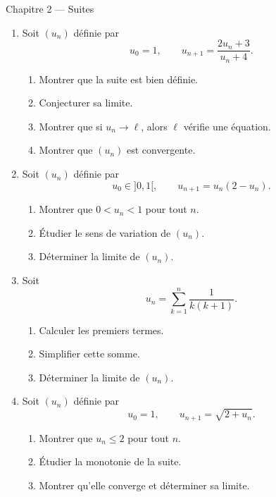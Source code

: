\documentclass[11pt,a4paper]{article}
\begin{document}
\begin{chapitrebox}{Chapitre 2 --- Suites}
\end{chapitrebox}

\begin{enumerate}[label=\textbf{Exercice \arabic*.}, start=1, leftmargin=*, itemsep=1em]

\item Soit \((u_n)\) définie par
\[
u_0=1,\qquad u_{n+1}=\frac{2u_n+3}{u_n+4}.
\]

\begin{enumerate}[label=\alph*)]
    \item Montrer que la suite est bien définie.
    \item Conjecturer sa limite.
    \item Montrer que si \(u_n\to \ell\), alors \(\ell\) vérifie une équation.
    \item Montrer que \((u_n)\) est convergente.
\end{enumerate}

\item Soit \((u_n)\) définie par
\[
u_0\in ]0,1[,\qquad u_{n+1}=u_n(2-u_n).
\]

\begin{enumerate}[label=\alph*)]
    \item Montrer que \(0<u_n<1\) pour tout \(n\).
    \item Étudier le sens de variation de \((u_n)\).
    \item Déterminer la limite de \((u_n)\).
\end{enumerate}

\item Soit
\[
u_n=\sum_{k=1}^n \frac{1}{k(k+1)}.
\]

\begin{enumerate}[label=\alph*)]
    \item Calculer les premiers termes.
    \item Simplifier cette somme.
    \item Déterminer la limite de \((u_n)\).
\end{enumerate}

\item Soit \((u_n)\) définie par
\[
u_0=1,\qquad u_{n+1}=\sqrt{2+u_n}.
\]

\begin{enumerate}[label=\alph*)]
    \item Montrer que \(u_n\leq 2\) pour tout \(n\).
    \item Étudier la monotonie de la suite.
    \item Montrer qu'elle converge et déterminer sa limite.
\end{enumerate}


\end{enumerate}
\end{document}
